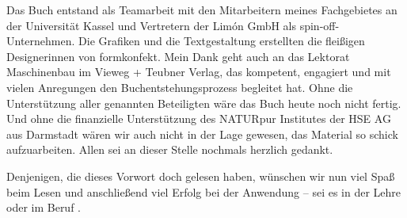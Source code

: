 Das Buch entstand als Teamarbeit mit den Mitarbeitern meines Fachgebietes an der Universität Kassel und Vertretern der Limón GmbH als spin-off-Unternehmen. Die Grafiken und die Textgestaltung erstellten die fleißigen Designerinnen von formkonfekt. Mein Dank geht auch an das Lektorat Maschinenbau im Vieweg + Teubner Verlag, das kompetent, engagiert und mit vielen Anregungen den Buchentstehungsprozess begleitet hat. Ohne die Unterstützung aller genannten Beteiligten wäre das Buch heute noch nicht fertig. Und ohne die finanzielle Unterstützung des NATURpur Institutes der HSE AG aus Darmstadt wären wir auch nicht in der Lage gewesen, das Material so schick aufzuarbeiten. Allen sei an dieser Stelle nochmals herzlich gedankt.\par\bigskip

Denjenigen, die dieses Vorwort doch gelesen haben, wünschen wir nun viel Spaß beim Lesen und anschließend viel Erfolg bei der Anwendung – sei es in der Lehre oder im Beruf \parencite[S.~V]{Hesselbach.2012}.